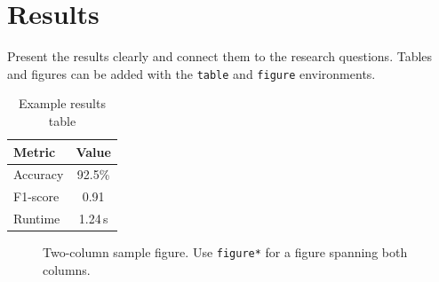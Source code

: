 \section{Results}
Present the results clearly and connect them to the research questions. Tables and figures can be added with the \texttt{table} and \texttt{figure} environments.

\begin{table}[htbp]
  \caption{Example results table}
  \label{tab:example-results}
  \centering
  \begin{tabular}{lc}
    \toprule
    Metric & Value \\
    \midrule
    Accuracy & 92.5\% \\
    F1-score & 0.91 \\
    Runtime & 1.24\,s \\
    \bottomrule
  \end{tabular}
\end{table}

\begin{figure}[!t]
  \centering
  
  \caption{Two-column sample figure. Use \texttt{figure*} for a figure spanning both columns.}
  \label{fig:two-column-example}
\end{figure}